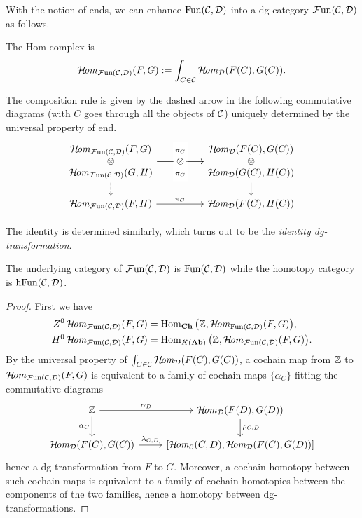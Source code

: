{With the notion of ends, we can enhance $\operatorname{Fun}({\cal C},{\cal D})$ 
into a dg-category $\operatorname{\mathcal{F}un}({\cal C},{\cal D})$ as follows. 
\begin{proplist}
\item 
The Hom-complex is 
\[
\operatorname{\mathcal{H}\!\mathit{om}}_{\operatorname{\mathcal{F}un}({\cal C},{\cal D})}(F,G):=
\int_{C\in{\cal C}}\operatorname{\mathcal{H}\!\mathit{om}}_{{\cal D}}(F(C),G(C)).
\]
\item 
The composition rule is given by the dashed arrow in
the following commutative diagrams 
(with $C$ goes through all the objects of ${\cal C}$)
uniquely determined by the universal property of end.
\[
\begin{tikzcd}[column sep=huge, row sep=scriptsize]
{
\begin{matrix}
\HHom_{\FFun(\Cc,\Dd)}(F,G) \\
\otimes \\
\HHom_{\FFun(\Cc,\Dd)}(G,H)
\end{matrix}
}
\ar[d,dashed]
\ar[r,"{
\begin{matrix}
\pi_C\\
\\
\pi_C
\end{matrix}}"description]
\ar[r,"\textstyle{\otimes}"description]
&
{
\begin{matrix}
\HHom_{\Dd}(F(C),G(C)) \\
\otimes \\
\HHom_{\Dd}(G(C),H(C))
\end{matrix}
}\ar[d]\\
\HHom_{\FFun(\Cc,\Dd)}(F,H)
\ar{r}{\pi_C}
&\HHom_{\Dd}(F(C),H(C))
\end{tikzcd}
\]
\item 
The identity is determined similarly, 
which turns out to be the \emph{identity dg-transformation}.
\end{proplist}
}

\begin{proposition}
The underlying category of $\operatorname{\mathcal{F}un}({\cal C},{\cal D})$ is 
$\operatorname{Fun}({\cal C},{\cal D})$ while the homotopy category is 
$\operatorname{hFun}({\cal C},{\cal D})$.
\end{proposition}
\begin{proof}
First we have
\begin{align*}
Z^0\operatorname{\mathcal{H}\!\mathit{om}}_{\operatorname{\mathcal{F}un}({\cal C},{\cal D})}(F,G) &= 
\operatorname{Hom}_{\mathbf{Ch}}\big({\mathbb Z},\operatorname{\mathcal{H}\!\mathit{om}}_{\operatorname{Fun}({\cal C},{\cal D})}(F,G)\big),\\
H^0\operatorname{\mathcal{H}\!\mathit{om}}_{\operatorname{\mathcal{F}un}({\cal C},{\cal D})}(F,G) &= 
\operatorname{Hom}_{K(\mathbf{Ab})}\big({\mathbb Z},\operatorname{\mathcal{H}\!\mathit{om}}_{\operatorname{\mathcal{F}un}({\cal C},{\cal D})}(F,G)\big).
\end{align*}
By the universal property of 
$\int_{C\in{\cal C}}\operatorname{\mathcal{H}\!\mathit{om}}_{{\cal D}}(F(C),G(C))$, 
a cochain map from ${\mathbb Z}$ to $\operatorname{\mathcal{H}\!\mathit{om}}_{\operatorname{\mathcal{F}un}({\cal C},{\cal D})}(F,G)$ 
is equivalent to a family of cochain maps $\{\alpha_C\}$ 
fitting the commutative diagrams
\[
\begin{tikzcd}
\ZZ\ar{d}[swap]{\alpha_C}\ar{r}{\alpha_D}&
\HHom_{\Dd}(F(D),G(D))\ar{d}{\rho_{C,D}}\\
\HHom_{\Dd}(F(C),G(C))\ar{r}{\lambda_{C,D}}&
{[\HHom_{\Cc}(C,D),\HHom_{\Dd}(F(C),G(D))]}
\end{tikzcd}
\]
hence a dg-transformation from $F$ to $G$. 
Moreover, a cochain homotopy between such cochain maps 
is equivalent to a family of cochain homotopies between 
the components of the two families, hence 
a homotopy between dg-transformations.
\end{proof}

